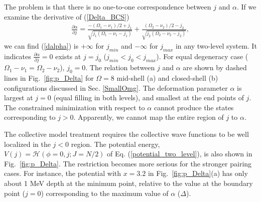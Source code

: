 \documentclass[11pt]{book} %
\begin{document}
The problem is that
there is no one-to-one correspondence between $j$ and $\alpha$.
If we examine the derivative of (\ref{Delta_BCS})
\begin{align}
\frac{\partial\alpha}{\partial j} = \frac{-(\Omega_1-\nu_1)/2+j_1}{\sqrt{j_1(\Omega_1-\nu_1-j_1)}} + \frac{(\Omega_2-\nu_2)/2-j_2}{\sqrt{j_2(\Omega_2-\nu_2-j_2)}} ,
 \label{dalpha}
\end{align}
we can find (\ref{dalpha}) is $+\infty$ for $j_{min}$ and $-\infty$ for $j_{max}$ in any two-level system. It indicates $\frac{\partial\alpha}{\partial j} =0$ exists at $j=j_0$ ($j_{min}<j_0<j_{max}$). For equal degeneracy case ($\Omega_1-\nu_1=\Omega_2-\nu_2$), $j_0=0$. 
The relation between $j$ and $\alpha$ 
are shown by dashed lines in Fig.~\ref{fig:p_Delta} 
for $\Omega=8$ mid-shell (a) and closed-shell (b) configurations discussed in Sec. \ref{SmallOmg}.
The deformation parameter $\alpha$ is largest at $j=0$ (equal filling in both levels),
and smallest at the end points of $j$.
The constrained minimization with respect to $\alpha$ cannot 
produce the states corresponding to $j>0$.
Apparently, we cannot map the entire region of $j$ to $\alpha$.

The collective model treatment
requires the collective wave functions to be well localized
in the $j<0$ region.
The potential energy, $V(j)=\mathcal{H}(\phi=0,j;J=N/2)$ of
Eq. (\ref{potential_two_level}), is also shown in
Fig.~\ref{fig:p_Delta}.
The restriction becomes more serious for the stronger pairing cases.
For instance, the potential with $x=3.2$ in Fig.~\ref{fig:p_Delta}(a)
has only about 1 MeV depth at the minimum point, relative to the value
at the boundary point ($j=0$) corresponding to
the maximum value of $\alpha$ ($\Delta$).
\end{document}
